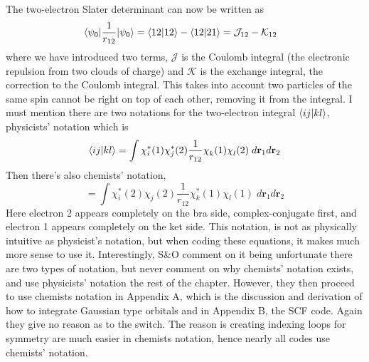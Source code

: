 \documentclass[11pt]{article}
\begin{document}
The two-electron Slater determinant can now be written as 
\begin{align*}
\mel{\psi_0}{\frac{1}{r_{12}}}{\psi_0} &= \ip{12}{12} - \ip{12}{21} = \mathcal{J}_{12} - \mathcal{K}_{12}
\end{align*}
where we have introduced two terms, $\mathcal{J}$ is the Coulomb integral (the electronic repulsion from two clouds of charge) and $\mathcal{K}$ is the exchange integral, the correction to the Coulomb integral. This takes into account two particles of the same spin cannot be right on top of each other, removing it from the integral.  
I must mention there are two notations for the two-electron integral $\ip{ij}{kl}$, physicists' notation which is
\begin{equation}
\ip{ij}{kl}=\int \chi_{i}^*(1) \chi_{j}^*(2) \frac{1}{r_{12}} \chi\s{k}(1) \chi\s{l}(2) \; d\mathbf{r}_1 d\mathbf{r}_2
\end{equation}
Then there's also chemists' notation, 
\begin{equation}
[ij|kl]=\int \chi_i^*(2)\chi_{j}^{}(2)\frac{1}{r_{12}}\chi_{k}^{*}(1)\chi_{l}^{}(1) \; d\mathbf{r}_1 d\mathbf{r}_2
\end{equation}
Here electron 2 appears completely on the bra side, complex-conjugate first, and electron 1 appears completely on the ket side. This notation, is not as physically intuitive as physicist's notation, but when coding these equations, it makes much more sense to use it. Interestingly, S\&O comment on it being unfortunate there are two types of notation, but never comment on why chemists' notation exists, and use physicists' notation the rest of the chapter. However, they then proceed to use chemists notation in Appendix A, which is the discussion and derivation of how to integrate Gaussian type orbitals and in Appendix B, the SCF code. Again they give no reason as to the switch. The reason is creating indexing loops for symmetry are much easier in chemists notation, hence nearly all codes use chemists' notation.  
\end{document}
